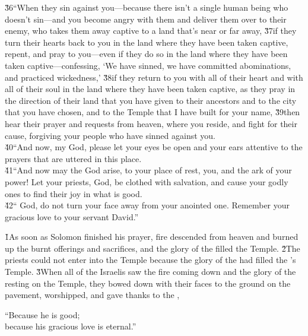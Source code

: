 \begin{poetry}
\poeml \v{36}``When they sin against you---because there isn't a single human being who doesn't sin---and you become angry with them and deliver them over to their enemy, who takes them away captive to a land that's near or far away, \v{37}if they turn their hearts back to you in the land where they have been taken captive, repent, and pray to you---even if they do so in the land where they have been taken captive---confessing, `We have sinned, we have committed abominations, and practiced wickedness,' \v{38}if they return to you with all of their heart and with all of their soul in the land where they have been taken captive, as they pray in the direction of their land that you have given to their ancestors and to the city that you have chosen, and to the Temple that I have built for your name, \v{39}then hear their prayer and requests from heaven, where you reside, and fight for their cause, forgiving your people who have sinned against you. \\
\poeml \v{40}``And now, my God, please let your eyes be open and your ears attentive to the prayers that are uttered in this place. \\
\poeml \v{41}``And now may the  God arise, to your place of rest, you, and the ark of your power! Let your priests,  God, be clothed with salvation, and cause your godly ones to find their joy in what is good. \\
\poeml \v{42}`` God, do not turn your face away from your anointed one. Remember your gracious love to your servant David.''
\end{poetry}

\v{1}As soon as Solomon finished his prayer, fire descended from heaven and burned up the burnt offerings and sacrifices, and the glory of the  filled the Temple. \v{2}The priests could not enter into the Temple because the glory of the  had filled the 's Temple. \v{3}When all of the Israelis saw the fire coming down and the glory of the  resting on the Temple, they bowed down with their faces to the ground on the pavement, worshipped, and gave thanks to the ,

\begin{poetry}
\poeml ``Because he is good; \\
\poemll    because his gracious love is eternal.''
\end{poetry}


